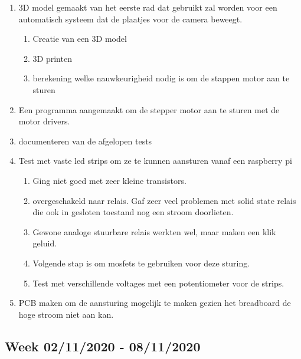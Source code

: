 \documentclass{article}
\begin{document}
\begin{enumerate}[1]
\item 3D model gemaakt van het eerste rad dat gebruikt zal worden voor een automatisch systeem dat de plaatjes voor de camera beweegt.
	\begin{enumerate}[a]
	\item Creatie van een 3D model
	\item 3D printen 
	\item berekening welke nauwkeurigheid nodig is om de stappen motor aan te sturen
	\end{enumerate}
\item Een programma aangemaakt om de stepper motor aan te sturen met de motor drivers. 
\item documenteren van de afgelopen tests
\item Test met vaste led strips om ze te kunnen aansturen vanaf een raspberry pi
	\begin{enumerate}[a]
	\item Ging niet goed met zeer kleine transistors. 
	\item overgeschakeld naar relais. Gaf zeer veel problemen met solid state relais die ook in gesloten toestand nog een stroom doorlieten.
	\item Gewone analoge stuurbare relais werkten wel, maar maken een klik geluid. 
	\item Volgende stap is om mosfets te gebruiken voor deze sturing.
	\item Test met verschillende voltages met een potentiometer voor de strips.
	\end{enumerate}
\item PCB maken om de aansturing mogelijk te maken gezien het breadboard de hoge stroom niet aan kan. 
\end{enumerate}


\subsection{Week 02/11/2020 - 08/11/2020}
\end{document}
